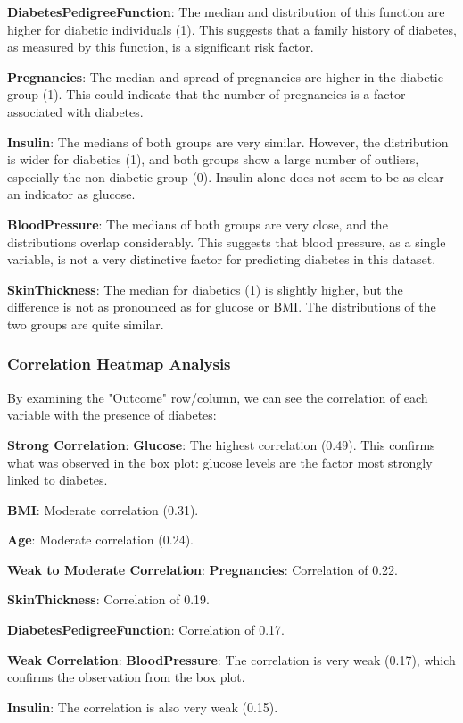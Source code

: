 \documentclass[12pt,a4paper]{article}
\begin{document}
\textbf{DiabetesPedigreeFunction}: The median and distribution of this function are higher for diabetic individuals (1). This suggests that a family history of diabetes, as measured by this function, is a significant risk factor.

\textbf{Pregnancies}: The median and spread of pregnancies are higher in the diabetic group (1). This could indicate that the number of pregnancies is a factor associated with diabetes.

\textbf{Insulin}: The medians of both groups are very similar. However, the distribution is wider for diabetics (1), and both groups show a large number of outliers, especially the non-diabetic group (0). Insulin alone does not seem to be as clear an indicator as glucose.

\textbf{BloodPressure}: The medians of both groups are very close, and the distributions overlap considerably. This suggests that blood pressure, as a single variable, is not a very distinctive factor for predicting diabetes in this dataset.

\textbf{SkinThickness}: The median for diabetics (1) is slightly higher, but the difference is not as pronounced as for glucose or BMI. The distributions of the two groups are quite similar.

\subsubsection{Correlation Heatmap Analysis}
By examining the "Outcome" row/column, we can see the correlation of each variable with the presence of diabetes:

\textbf{Strong Correlation}:
\textbf{Glucose}: The highest correlation (0.49). This confirms what was observed in the box plot: glucose levels are the factor most strongly linked to diabetes.

\textbf{BMI}: Moderate correlation (0.31).

\textbf{Age}: Moderate correlation (0.24).

\textbf{Weak to Moderate Correlation}:
\textbf{Pregnancies}: Correlation of 0.22.

\textbf{SkinThickness}: Correlation of 0.19.

\textbf{DiabetesPedigreeFunction}: Correlation of 0.17.

\textbf{Weak Correlation}:
\textbf{BloodPressure}: The correlation is very weak (0.17), which confirms the observation from the box plot.

\textbf{Insulin}: The correlation is also very weak (0.15).
\end{document}
